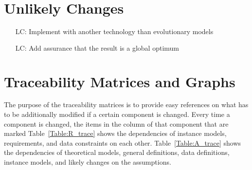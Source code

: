 \documentclass[12pt]{article}
\newcounter{lcnum} %
\begin{document}
\section{Unlikely Changes}   
\label{sec:uchanges} 

\noindent \begin{itemize}

\item[LC\refstepcounter{lcnum}\thelcnum\label{ULC_TECHNOLOGY}:] Implement \thisproject with another technology than evolutionary models

\item[LC\refstepcounter{lcnum}\thelcnum\label{ULC_FINDOPTIMUM}:] Add assurance that the result is a global optimum

\end{itemize}

\section{Traceability Matrices and Graphs}
\label{sec:tracer}

The purpose of the traceability matrices is to provide easy references on what
has to be additionally modified if a certain component is changed.  Every time a
component is changed, the items in the column of that component that are marked
Table~\ref{Table:R_trace} shows the
dependencies of instance models, requirements, and data constraints on each
other. Table~\ref{Table:A_trace} shows the dependencies of theoretical models,
general definitions, data definitions, instance models, and likely changes on
the assumptions.
\end{document}
